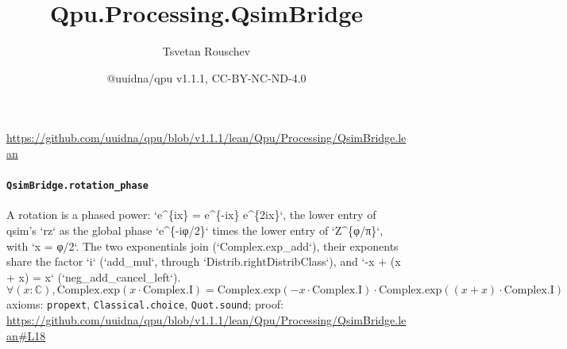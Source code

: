 \documentclass[11pt]{article}
\title{Qpu.Processing.QsimBridge}
\author{Tsvetan Rouschev}
\date{@uuidna/qpu v1.1.1, CC-BY-NC-ND-4.0}
\begin{document}
\maketitle
\noindent\url{https://github.com/uuidna/qpu/blob/v1.1.1/lean/Qpu/Processing/QsimBridge.lean}

\paragraph{\texttt{QsimBridge.rotation\_phase}}
A rotation is a phased power: `e\^{}\{ix\} = e\^{}\{-ix\} e\^{}\{2ix\}`, the lower entry of qsim's `rz` as the global phase `e\^{}\{-iφ/2\}` times the lower entry of `Z\^{}\{φ/π\}`, with `x = φ/2`. The two exponentials join (`Complex.exp\_add`), their exponents share the factor `i` (`add\_mul`, through `Distrib.rightDistribClass`), and `-x + (x + x) = x` (`neg\_add\_cancel\_left`).
\[ \forall (x : \mathbb{C}), \mathrm{Complex.exp} (x \cdot \mathrm{Complex.I}) = \mathrm{Complex.exp} (-x \cdot \mathrm{Complex.I}) \cdot \mathrm{Complex.exp} ((x + x) \cdot \mathrm{Complex.I}) \]
\noindent axioms: \texttt{propext}, \texttt{Classical.choice}, \texttt{Quot.sound}; proof: \url{https://github.com/uuidna/qpu/blob/v1.1.1/lean/Qpu/Processing/QsimBridge.lean\#L18}
\end{document}

